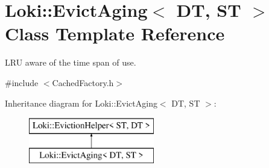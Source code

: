 \hypertarget{classLoki_1_1EvictAging}{}\section{Loki\+:\+:Evict\+Aging$<$ D\+T, S\+T $>$ Class Template Reference}
\label{classLoki_1_1EvictAging}


L\+R\+U aware of the time span of use.  




{\ttfamily \#include $<$Cached\+Factory.\+h$>$}

Inheritance diagram for Loki\+:\+:Evict\+Aging$<$ D\+T, S\+T $>$\+:\begin{figure}[H]
\begin{center}
\leavevmode
\includegraphics[height=2.000000cm]{classLoki_1_1EvictAging}
\end{center}
\end{figure}

